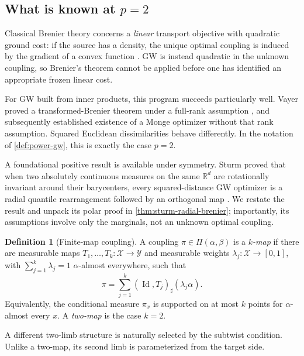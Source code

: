 \documentclass[11pt,a4paper]{article}
\theoremstyle{definition}
\newtheorem{definition}[theorem]{Definition}
\theoremstyle{remark}
\newcommand{\R}{\mathbb R}
\newcommand{\Piopt}{\Pi}
\newcommand{\Id}{\operatorname{Id}}
\begin{document}
\subsection{What is known at \texorpdfstring{\(p=2\)}{p=2}}

Classical Brenier theory concerns a \emph{linear} transport objective with
quadratic ground cost: if the source has a density, the unique optimal
coupling is induced by the gradient of a convex function
\citep{Brenier1991,Villani2009,Santambrogio2015}.  GW is instead quadratic in
the unknown coupling, so Brenier's theorem cannot be applied before one has
identified an appropriate frozen linear cost.

For GW built from inner products, this program succeeds particularly well.
Vayer proved a transformed-Brenier theorem under a full-rank assumption
\citep[Theorem~4.2.3]{Vayer2020}, and
\citet{DumontLacombeVialard2025} subsequently established existence of a
Monge optimizer without that rank assumption.  Squared Euclidean
dissimilarities behave differently.  In the notation of
\cref{def:power-gw}, this is exactly the case \(p=2\).

A foundational positive result is available under symmetry.  Sturm proved
that when two absolutely continuous measures on the same \(\R^d\) are
rotationally invariant around their barycenters, every squared-distance GW
optimizer is a radial quantile rearrangement followed by an orthogonal map
\citep[Theorem~9.21]{Sturm2023Space}.  We restate the result and unpack its
polar proof in \cref{thm:sturm-radial-brenier}; importantly, its assumptions
involve only the marginals, not an unknown optimal coupling.

\begin{definition}[Finite-map coupling]
\label{def:two-map}
A coupling \(\pi\in\Piopt(\alpha,\beta)\) is a \emph{\(k\)-map} if there are
measurable maps \(T_1,\ldots,T_k:\mathcal X\to\mathcal Y\) and measurable
weights \(\lambda_j:\mathcal X\to[0,1]\), with
\(\sum_{j=1}^k\lambda_j=1\) \(\alpha\)-almost everywhere, such that
\[
  \pi=\sum_{j=1}^k(\Id,T_j)_\sharp(\lambda_j\alpha).
\]
Equivalently, the conditional measure \(\pi_x\) is supported on at most \(k\)
points for \(\alpha\)-almost every \(x\).  A \emph{two-map} is the case
\(k=2\).
\end{definition}

A different two-limb structure is naturally selected by the subtwist
condition.  Unlike a two-map, its second limb is parameterized from the target
side.
\end{document}
